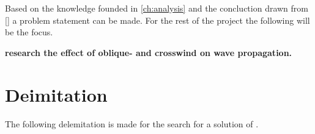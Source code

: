 Based on the knowledge founded in \autoref{ch:analysis} and the concluction drawn from \autoref{} a problem statement can be made. For the rest of the project the following will be the focus.


\textbf{research the effect of oblique- and crosswind on wave propagation.}

\section{Deimitation}
The following delemitation is made for the search for a solution of .